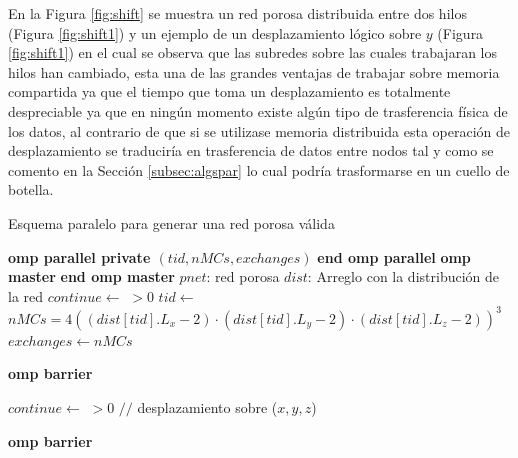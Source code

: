 En la Figura \ref{fig:shift} se muestra un red porosa distribuida entre dos hilos (Figura \ref{fig:shift1}) y un ejemplo de un desplazamiento lógico sobre $y$ (Figura \ref{fig:shift1}) en el cual se observa que las subredes sobre las cuales trabajaran los hilos han cambiado, esta una de las grandes ventajas de trabajar sobre memoria compartida ya que el tiempo que  toma un desplazamiento es totalmente despreciable ya que en ningún momento existe algún tipo de trasferencia física de los datos, al contrario de que si se utilizase memoria distribuida esta operación de desplazamiento se traduciría en trasferencia de datos entre nodos tal y como se comento en la Secci\'on \ref{subsec:algspar} lo cual podría trasformarse en un cuello de botella.\\

\begin{algorithm}
\caption{Esquema paralelo para generar una red porosa válida}\label{alg:pvalidnet}
\begin{algorithmic}[1]
    {\textbf{omp parallel private $(tid,nMCs,exchanges)$}}
    {\textbf{end omp parallel}}    
    {\textbf{omp master}}
    {\textbf{end omp master}}
\Require $pnet$: red porosa
\Require $dist$: Arreglo con la distribución de la red
\State $continue \gets$  $ > 0$
\ompparallel
	\State $tid \gets $ 
	\State $nMCs=4(( dist[tid].L_x  - 2) \cdot (dist[tid].L_y - 2) \cdot (dist[tid].L_z - 2))^3$
		\State $exchanges \gets nMCs$
			\State {}
				\State {}
			\EndIf
		\EndWhile
		
		\State \textbf{omp barrier}
		
		\ompmaster
			\State $continue \gets$  $ > 0$		
				\State {} {$//$ desplazamiento sobre ($x,y,z$)}
			\EndIf
		\eompmaster

		\State \textbf{omp barrier}
	\EndWhile
\eompparallel
\end{algorithmic}
\end{algorithm}

